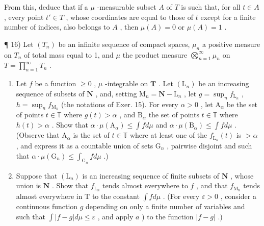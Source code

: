 From this, deduce that if a \(\mu\) -measurable subset \(A\) of \(T\) is such that, for all \(t \in A\) , every point \(t' \in T\) , whose coordinates are equal to those of \(t\) except for a finite number of indices, also belongs to \(A\) , then \(\mu(A) = 0\) or \(\mu(A) = 1\) .

¶ 16) Let \((T_n)\) be an infinite sequence of compact spaces, \(\mu_n\) a positive measure on \(T_n\) of total mass equal to 1, and \(\mu\) the product measure \(\bigotimes_{n=1}^{\infty} \mu_n\) on \(T = \prod_{n=1}^{\infty} T_n\) .

\begin{enumerate}
\def\labelenumi{\alph{enumi})}
\item
  Let \(f\) be a function \(\geqslant 0\) , \(\mu\) -integrable on \(\mathbf{T}\) . Let \((\mathrm{L}_n)\) be an increasing sequence of subsets of \(\mathbf{N}\) , and, setting \(\mathrm{M}_n = \mathbf{N} - \mathrm{L}_n\) , let \(g = \sup_n f_{\mathrm{L}_n}\) , \(h = \sup_n f_{\mathrm{M}_n}\) (the notations of Exer. 15). For every \(\alpha > 0\) , let \(\mathrm{A}_{\alpha}\) be the set of points \(t \in \mathbb{T}\) where \(g(t) > \alpha\) , and \(\mathrm{B}_{\alpha}\) the set of points \(t \in \mathbb{T}\) where \(h(t) > \alpha\) . Show that \(\alpha \cdot \mu(\mathrm{A}_{\alpha}) \leqslant \int f d\mu\) and \(\alpha \cdot \mu(\mathrm{B}_{\alpha}) \leqslant \int f d\mu\) . (Observe that \(\mathrm{A}_{\alpha}\) is the set of \(t \in \mathbb{T}\) where at least one of the \(f_{\mathrm{L}_n}(t)\) is \(> \alpha\) , and express it as a countable union of sets \(\mathrm{G}_n\) , pairwise disjoint and such that \(\alpha \cdot \mu(\mathrm{G}_n) \leqslant \int_{\mathrm{G}_n} f d\mu\) .)
\item
  Suppose that \((\mathrm{L}_n)\) is an increasing sequence of finite subsets of \(\mathbf{N}\) , whose union is \(\mathbf{N}\) . Show that \(f_{\mathrm{L}_n}\) tends almost everywhere to \(f\) , and that \(f_{\mathrm{M}_n}\) tends almost everywhere in \(\mathrm{T}\) to the constant \(\int f d\mu\) . (For every \(\varepsilon > 0\) , consider a continuous function \(g\) depending on only a finite number of variables and such that \(\int |f - g| d\mu \leqslant \varepsilon\) , and apply \(a\) ) to the function \(|f - g|\) .)
\end{enumerate}

